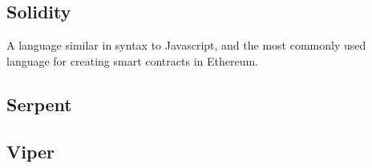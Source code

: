 \documentclass[10pt,a4paper,leqno,bibliography=totoc]{scrartcl}
\newenvironment{alphafootnotes}
{\par\edef\savedfootnotenumber{\number\value{footnote}}
\renewcommand{\thefootnote}{\alph{footnote}}
\setcounter{footnote}{0}}
{\par\setcounter{footnote}{\savedfootnotenumber}}
\begin{document}
\begin{alphafootnotes}
		\subsection{Solidity}
			A language similar in syntax to Javascript, and the most commonly used language for creating smart contracts in Ethereum.
		\subsection{Serpent}

		\subsection{Viper}



\clearpage
\begin{multicols*}{2}
\printbibliography
\clearpage
\printglossary[type=\acronymtype]
\glsaddall
\printnoidxglossaries
\clearpage
\end{multicols*}
\end{alphafootnotes}

\printindex
\end{document}

